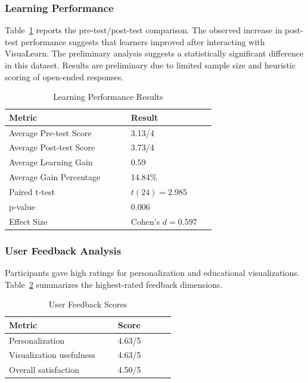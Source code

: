 \documentclass[conference]{IEEEtran}
\begin{document}
\subsubsection{Learning Performance}

Table~\ref{tab:learning-performance} reports the pre-test/post-test comparison. The observed increase in post-test performance suggests that learners improved after interacting with VisuaLearn. The preliminary analysis suggests a statistically significant difference in this dataset. Results are preliminary due to limited sample size and heuristic scoring of open-ended responses.

\begin{table}[htbp]
\caption{Learning Performance Results}
\label{tab:learning-performance}
\centering
\begin{tabular}{p{0.52\linewidth}p{0.36\linewidth}}
\toprule
\textbf{Metric} & \textbf{Result} \\
\midrule
Average Pre-test Score & 3.13/4 \\
Average Post-test Score & 3.73/4 \\
Average Learning Gain & 0.59 \\
Average Gain Percentage & 14.84\% \\
Paired t-test & $t(24)=2.985$ \\
p-value & 0.006 \\
Effect Size & Cohen's $d=0.597$ \\
\bottomrule
\end{tabular}
\end{table}

\subsubsection{User Feedback Analysis}

Participants gave high ratings for personalization and educational visualizations. Table~\ref{tab:user-feedback} summarizes the highest-rated feedback dimensions.

\begin{table}[htbp]
\caption{User Feedback Scores}
\label{tab:user-feedback}
\centering
\begin{tabular}{p{0.58\linewidth}p{0.30\linewidth}}
\toprule
\textbf{Metric} & \textbf{Score} \\
\midrule
Personalization & 4.63/5 \\
Visualization usefulness & 4.63/5 \\
Overall satisfaction & 4.50/5 \\
\bottomrule
\end{tabular}
\end{table}
\end{document}
